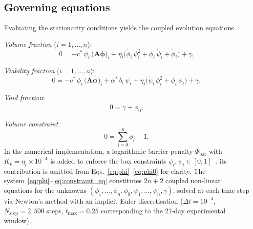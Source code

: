 \documentclass[pdflatex,sn-mathphys-num,lineno]{sn-jnl}
\newcommand{\bphi}{\boldsymbol{\phi}}
\begin{document}
\subsection{Governing equations}


Evaluating the stationarity conditions yields the coupled evolution equations~\cite{Klempt2025ContinuumBiofilm}:

\medskip\noindent
\textit{Volume fraction} ($i=1,\dots,n$):
\begin{equation}
0 = -c^*\,\psi_i\,\bigl(\mathbf{A}\bar{\bphi}\bigr)_i
    + \eta_i\bigl(\dot\phi_i\,\psi_i^2 + \bar\phi_i\,\dot\psi_i + \dot\phi_i\bigr)
    + \gamma,
\label{eq:phi}
\end{equation}

\noindent\textit{Viability fraction} ($i=1,\dots,n$):
\begin{equation}
0 = -c^*\,\phi_i\,\bigl(\mathbf{A}\bar{\bphi}\bigr)_i
    + \alpha^*\,b_i\,\psi_i
    + \eta_i\bigl(\dot\psi_i\,\phi_i^2 + \bar\phi_i\,\dot\phi_i\bigr)
    + \gamma,
\label{eq:psi_evol}
\end{equation}

\noindent\textit{Void fraction}:
\begin{equation}
0 = \gamma + \dot\phi_0,
\label{eq:phi0}
\end{equation}

\noindent\textit{Volume constraint}:
\begin{equation}
0 = \sum_{l=0}^{n}\phi_l - 1,
\label{eq:constraint_eq}
\end{equation}
In the numerical implementation, a logarithmic barrier penalty $\Psi_{\mathrm{bar}}$ with $K_p=\eta_i\times10^{-4}$ is added to enforce the box constraints $\phi_i,\psi_i\in[0,1]$~\cite{Klempt2025ContinuumBiofilm}; its contribution is omitted from Eqs.~\eqref{eq:phi}--\eqref{eq:phi0} for clarity.
The system~\eqref{eq:phi}--\eqref{eq:constraint_eq} constitutes $2n+2$ coupled non-linear equations for the unknowns $(\phi_1,\dots,\phi_n,\phi_0,\psi_1,\dots,\psi_n,\gamma)$, solved at each time step via Newton's method with an implicit Euler discretisation ($\Delta t = 10^{-4}$, $N_{\mathrm{step}}=2{,}500$ steps, $t_{\max}=0.25$ corresponding to the 21-day experimental window).
\end{document}
